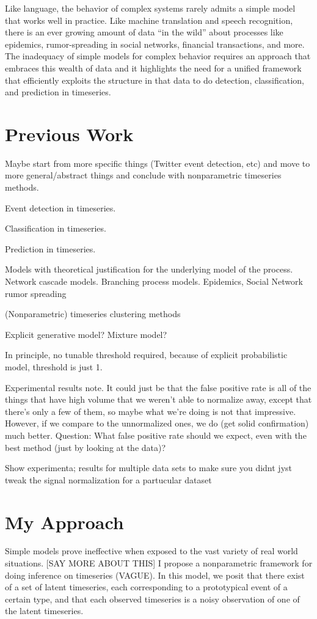 Like language, the behavior of complex systems rarely admits a simple model that works well in practice. Like machine translation and speech recognition, there is an ever growing amount of data ``in the wild'' about processes like epidemics, rumor-spreading in social networks, financial transactions, and more. The inadequacy of simple models for complex behavior requires an approach that embraces this wealth of data and it highlights the need for a unified framework that efficiently exploits the structure in that data to do detection, classification, and prediction in timeseries.

\section{Previous Work}
Maybe start from more specific things (Twitter event detection, etc) and move to more general/abstract things and conclude with nonparametric timeseries methods.

Event detection in timeseries.

Classification in timeseries.

Prediction in timeseries.

Models with theoretical justification for the underlying model of the process. Network cascade models. Branching process models.
Epidemics, Social Network rumor spreading

(Nonparametric) timeseries clustering methods

Explicit generative model? Mixture model?

In principle, no tunable threshold required, because of explicit probabilistic model, threshold is just 1.

Experimental results note. It could just be that the false positive rate is all of the things that have high volume that we weren't able to normalize away, except that there's only a few of them, so maybe what we're doing is not that impressive. However, if we compare to the unnormalized ones, we do (get solid confirmation) much better. Question: What false positive rate should we expect, even with the best method (just by looking at the data)?


Show experimenta; results for multiple data sets to make sure you didnt jyst tweak the signal normalization for a partucular dataset 

\section{My Approach}
Simple models prove ineffective when exposed to the vast variety of real world situations. [SAY MORE ABOUT THIS] I propose a nonparametric framework for doing inference on timeseries (VAGUE). In this model, we posit that there exist of a set of latent timeseries, each corresponding to a prototypical event of a certain type, and that each observed timeseries is a noisy observation of one of the latent timeseries.

